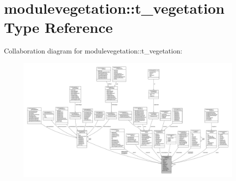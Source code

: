 \hypertarget{structmodulevegetation_1_1t__vegetation}{}\section{modulevegetation\+:\+:t\+\_\+vegetation Type Reference}
\label{structmodulevegetation_1_1t__vegetation}


Collaboration diagram for modulevegetation\+:\+:t\+\_\+vegetation\+:\nopagebreak
\begin{figure}[H]
\begin{center}
\leavevmode
\includegraphics[width=350pt]{structmodulevegetation_1_1t__vegetation__coll__graph}
\end{center}
\end{figure}
